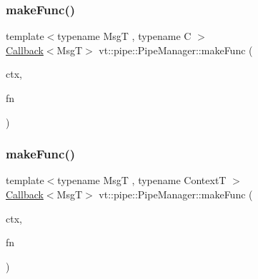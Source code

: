 \subsubsection{\texorpdfstring{make\+Func()}{makeFunc()}\hspace{0.1cm}{\footnotesize\ttfamily [2/6]}}
{\footnotesize\ttfamily template$<$typename MsgT , typename C $>$ \\
\hyperlink{namespacevt_a36db99df4c973d48b1118a293fff533f}{Callback}$<$MsgT$>$ vt\+::pipe\+::\+Pipe\+Manager\+::make\+Func (\begin{DoxyParamCaption}\item[{C $\ast$}]{ctx,  }\item[{\hyperlink{structvt_1_1pipe_1_1_pipe_manager_base_a73fdf82ece0411b3dc644c99b763f7a9}{Func\+Msg\+Ctx\+Type}$<$ MsgT, C $>$}]{fn }\end{DoxyParamCaption})}

\mbox{\label{structvt_1_1pipe_1_1_pipe_manager_adb73a299b634a180ae3814b41b9ce255}} 
\subsubsection{\texorpdfstring{make\+Func()}{makeFunc()}\hspace{0.1cm}{\footnotesize\ttfamily [3/6]}}
{\footnotesize\ttfamily template$<$typename MsgT , typename ContextT $>$ \\
\hyperlink{namespacevt_a36db99df4c973d48b1118a293fff533f}{Callback}$<$MsgT$>$ vt\+::pipe\+::\+Pipe\+Manager\+::make\+Func (\begin{DoxyParamCaption}\item[{ContextT $\ast$}]{ctx,  }\item[{\hyperlink{structvt_1_1pipe_1_1_pipe_manager_base_a73fdf82ece0411b3dc644c99b763f7a9}{Func\+Msg\+Ctx\+Type}$<$ MsgT, ContextT $>$}]{fn }\end{DoxyParamCaption})}

\mbox{\label{structvt_1_1pipe_1_1_pipe_manager_a53201c2a1d558751fd3f2473a86678ab}} 
